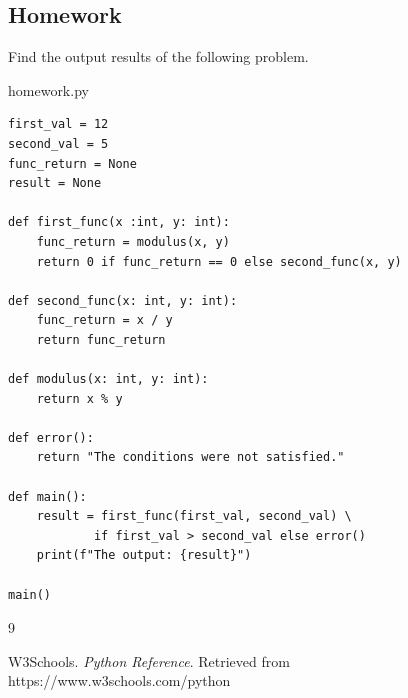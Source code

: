 \documentclass{report}
\begin{document}
\subsection*{Homework}
Find the output results  of the following problem.
\begin{vscode}{homework.py}
\begin{lstlisting}[style=vscodeStyle]
first_val = 12
second_val = 5
func_return = None
result = None

def first_func(x :int, y: int):
    func_return = modulus(x, y)
    return 0 if func_return == 0 else second_func(x, y)

def second_func(x: int, y: int):
    func_return = x / y
    return func_return

def modulus(x: int, y: int):
    return x % y

def error():
    return "The conditions were not satisfied."

def main():
    result = first_func(first_val, second_val) \
            if first_val > second_val else error()
    print(f"The output: {result}")
    
main()
\end{lstlisting}
\end{vscode}

\renewcommand{\bibname}{References}
\begin{thebibliography}{9}

W3Schools. \textit{Python Reference}. 
Retrieved from https://www.w3schools.com/python

\end{thebibliography}
\end{document}
